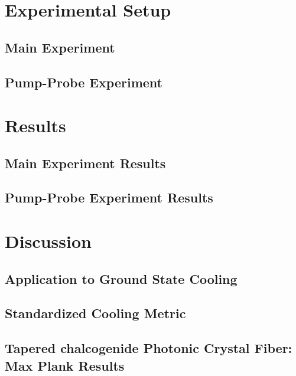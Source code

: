 
\section{Experimental Setup}
\label{sec:Cooling:Setup}


\subsection{Main Experiment}
\label{subsec:Cooling:Setup:Main}


\subsection{Pump-Probe Experiment}
\label{subsec:Cooling:Setup:Pump-Probe}


\section{Results}
\label{sec:Cooling:Results}


\subsection{Main Experiment Results}
\label{subsec:Cooling:Results:Main}


\subsection{Pump-Probe Experiment Results}
\label{subsec:Cooling:Results:Pump-Probe}


\section{Discussion}
\label{sec:Cooling:Discussion}


\subsection{Application to Ground State Cooling}
\label{subsec:Cooling:Discussion:Ground-State}


\subsection{Standardized Cooling Metric}
\label{subsec:Cooling:Discussion:Metric}


\subsection{Tapered chalcogenide Photonic Crystal Fiber: Max Plank Results}
\label{subsec:Cooling:Discussion:Max-Plank}
